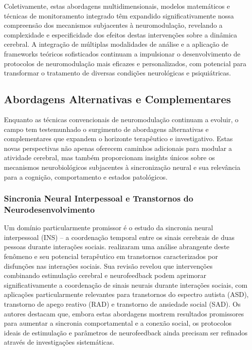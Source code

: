 Coletivamente, estas abordagens multidimensionais, modelos matemáticos e técnicas de monitoramento integrado têm expandido significativamente nossa compreensão dos mecanismos subjacentes à neuromodulação, revelando a complexidade e especificidade dos efeitos destas intervenções sobre a dinâmica cerebral. A integração de múltiplas modalidades de análise e a aplicação de frameworks teóricos sofisticados continuam a impulsionar o desenvolvimento de protocolos de neuromodulação mais eficazes e personalizados, com potencial para transformar o tratamento de diversas condições neurológicas e psiquiátricas.

\subsection{Abordagens Alternativas e Complementares}
Enquanto as técnicas convencionais de neuromodulação continuam a evoluir, o campo tem testemunhado o surgimento de abordagens alternativas e complementares que expandem o horizonte terapêutico e investigativo. Estas novas perspectivas não apenas oferecem caminhos adicionais para modular a atividade cerebral, mas também proporcionam insights únicos sobre os mecanismos neurobiológicos subjacentes à sincronização neural e sua relevância para a cognição, comportamento e estados patológicos.

\subsubsection{Sincronia Neural Interpessoal e Transtornos do Neurodesenvolvimento}
Um domínio particularmente promissor é o estudo da sincronia neural interpessoal (INS) – a coordenação temporal entre os sinais cerebrais de duas pessoas durante interações sociais.  realizaram uma análise abrangente deste fenômeno e seu potencial terapêutico em transtornos caracterizados por disfunções nas interações sociais. Sua revisão revelou que intervenções combinando estimulação cerebral e neurofeedback podem aprimorar significativamente a coordenação de sinais neurais durante interações sociais, com aplicações particularmente relevantes para transtornos do espectro autista (ASD), transtorno de apego reativo (RAD) e transtorno de ansiedade social (SAD). Os autores destacam que, embora estas abordagens mostrem resultados promissores para aumentar a sincronia comportamental e a conexão social, os protocolos ideais de estimulação e parâmetros de neurofeedback ainda precisam ser refinados através de investigações sistemáticas.

